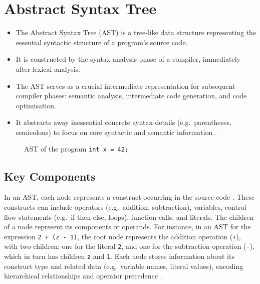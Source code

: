 \section{Abstract Syntax Tree}

\begin{itemize}
  \item The Abstract Syntax Tree (AST) is a tree-like data structure representing the essential syntactic structure of a program’s source code.
  \item It is constructed by the syntax analysis phase of a compiler, immediately after lexical analysis.
  \item The AST serves as a crucial intermediate representation for subsequent compiler phases: semantic analysis, intermediate code generation, and code optimisation.
  \item It abstracts away inessential concrete syntax details (e.g.\ parentheses, semicolons) to focus on core syntactic and semantic information \cite{aho2007compilers}.
\end{itemize}

\begin{figure}[hb!]
    \centering
    \caption{AST of the program \texttt{int x = 42;}}
    \label{fig:ast-tinyc}
\end{figure}

\subsection{Key Components}

In an AST, each node represents a construct occurring in the source code \cite{aho2007compilers}. These constructs can include operators (e.g.\ addition, subtraction), variables, control flow statements (e.g.\ if-then-else, loops), function calls, and literals. The children of a node represent its components or operands. For instance, in an AST for the expression \texttt{2 + (z - 1)}, the root node represents the addition operation (\texttt{+}), with two children: one for the literal \texttt{2}, and one for the subtraction operation (\texttt{-}), which in turn has children \texttt{z} and \texttt{1}. Each node stores information about its construct type and related data (e.g.\ variable names, literal values), encoding hierarchical relationships and operator precedence \cite{aho2007compilers}.

